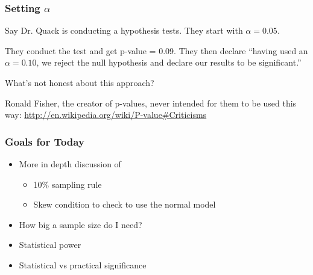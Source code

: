 \documentclass[handout]{beamer}
\newcommand{\blue}[1]{\textcolor{blue2}{#1}}
\begin{document}
\begin{frame}[fragile]
\frametitle{Setting $\alpha$}

Say Dr. Quack is conducting a hypothesis tests.  They start with $\alpha=0.05$.

\pause\vspace{0.5cm}

They conduct the test and get \blue{p-value = 0.09}.  They then declare ``having used an \blue{$\alpha=0.10$}, we reject the null hypothesis and declare our results to be significant.''

\pause\vspace{0.5cm}
What's not honest about this approach?

\pause\vspace{0.5cm}
Ronald Fisher, the creator of p-values, never intended for them to be used this way:  \blue{\href{http://en.wikipedia.org/wiki/P-value\#Criticisms}{http://en.wikipedia.org/wiki/P-value\#Criticisms}}

\end{frame}


\begin{frame}[fragile]
\frametitle{Goals for Today}

\begin{itemize}
\item More in depth discussion of 
\begin{itemize}
\item 10\% sampling rule
\item Skew condition to check to use the normal model
\end{itemize}
\item How big a sample size do I need?
\item Statistical power
\item Statistical vs practical significance
\end{itemize}

\end{frame}
\end{document}
